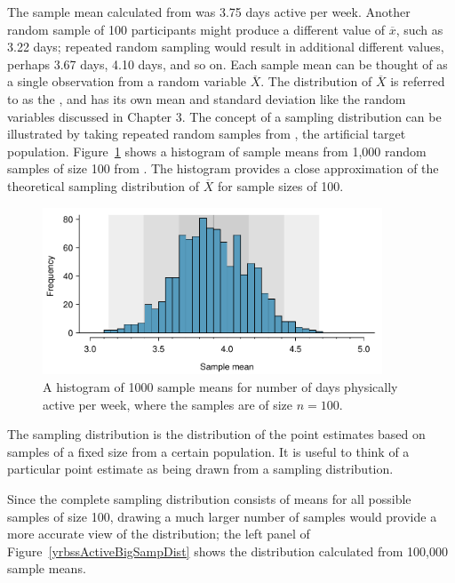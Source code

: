 \begin{spacing}{1.5}
The sample mean calculated from  was 3.75 days active per week. Another random sample of 100 participants might produce a different value of $\overline{x}$, such as 3.22 days; repeated random sampling would result in additional different values, perhaps 3.67 days, 4.10 days, and so on. Each sample mean can be thought of as a single observation from a random variable $\overline{X}$. The distribution of $\overline{X}$ is referred to as the , and has its own mean and standard deviation like the random variables discussed in Chapter 3. The concept of a sampling distribution can be illustrated by taking repeated random samples from , the artificial target population. Figure~\ref{yrbssActive1000SampDist} shows a histogram of sample means from 1,000 random samples of size 100 from . The histogram provides a close approximation of the theoretical sampling distribution of $\overline{X}$ for sample sizes of 100. 

\begin{figure}[h]
	\centering
	\includegraphics[width=0.9\textwidth]
	{ch_inference_foundations_oi_biostat/figures/yrbssActive1000SampDist/yrbssActive1000SampDist}
	\caption{A histogram of 1000 sample means for number of days physically active per week, where the samples are of size $n=100$.}
	\label{yrbssActive1000SampDist}
\end{figure}

\begin{termBox}{
The sampling distribution is the distribution of the point estimates based on samples of a fixed size from a certain population. It is useful to think of a particular point estimate as being drawn from a sampling distribution.}
\end{termBox}

Since the complete sampling distribution consists of means for all possible samples of size 100, drawing a much larger number of samples would provide a more accurate view of the distribution; the left panel of Figure~\ref{yrbssActiveBigSampDist} shows the distribution calculated from 100,000 sample means. 
 

\end{spacing}
